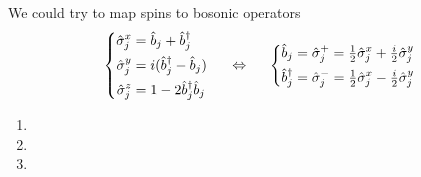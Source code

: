 We could try to map spins to bosonic operators
\begin{equation*}
	\left\{\begin{aligned}
		\hat{\sigma}_j^x &= \hat{b}_j+\hat{b}_j^{\dag} \\
		\hat{\sigma}_j^y &= i(\hat{b}_j^{\dag}-\hat{b}_j) \\
		\hat{\sigma}_j^z &= 1 - 2 \hat{b}_j^{\dag} \hat{b}_j
	\end{aligned}\right.
	\hspace{5 mm} \Leftrightarrow \hspace{5 mm} 
	\left\{\begin{aligned}
	    \hat{b}_j &= \hat{\sigma}_j^+ = \tfrac{1}{2}\hat{\sigma}_j^x + \tfrac{i}{2}\hat{\sigma}_j^y \\
	    \hat{b}_j^{\dag} &= \hat{\sigma}_j^- = \tfrac{1}{2}\hat{\sigma}_j^x - \tfrac{i}{2}\hat{\sigma}_j^y 
	\end{aligned}\right.
\end{equation*}

\begin{enumerate}[label=(\alph*)]
    \item  
    \item  
    \item  

\end{enumerate}